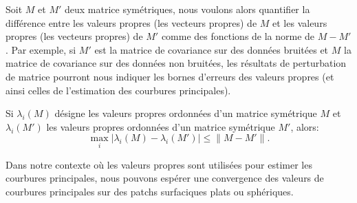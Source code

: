 Soit $M$ et $M'$ deux matrice symétriques, nous voulons alors quantifier la
différence entre les valeurs propres (\respp les vecteurs propres) de $M$ et les
valeurs propres (\resp les vecteurs propres) de $M'$ comme des fonctions de la
norme de $M - M'$. Par exemple, si $M'$ est la matrice de covariance sur des
données bruitées et $M$ la matrice de covariance sur des données non bruitées,
les résultats de perturbation de matrice pourront nous indiquer les bornes
d'erreurs des valeurs propres (et ainsi celles de l'estimation des courbures
principales).
%
\begin{theorem}{}
  \label{thm:lidskii-weyl}
  Si $\lambda_i(M)$ désigne les valeurs propres ordonnées d'un matrice
  symétrique $M$ et $\lambda_i(M')$ les valeurs propres ordonnées d'un matrice
  symétrique $M'$, alors:
  \begin{equation}
    \max_{i}| \lambda_i(M) - \lambda_i(M')| \le \|M-M'\| .
  \end{equation}
\end{theorem}
%
Dans notre contexte où les valeurs propres sont utilisées pour estimer les
courbures principales, nous pouvons espérer une convergence des valeurs de
courbures principales sur des patchs surfaciques plats ou sphériques.
%
